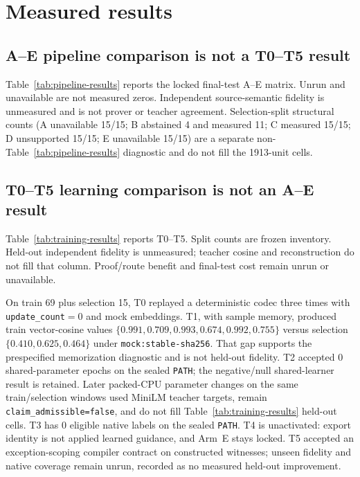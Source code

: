 \documentclass{article}
\begin{document}


\section{Measured results}
\subsection{A--E pipeline comparison is not a T0--T5 result}
Table~\ref{tab:pipeline-results} reports the locked final-test A--E matrix. Unrun and unavailable are not measured zeros. Independent source-semantic fidelity is unmeasured and is not prover or teacher agreement. Selection-split structural counts (A unavailable 15/15; B abstained 4 and measured 11; C measured 15/15; D unsupported 15/15; E unavailable 15/15) are a separate non-Table~\ref{tab:pipeline-results} diagnostic and do not fill the 1913-unit cells.



\subsection{T0--T5 learning comparison is not an A--E result}
Table~\ref{tab:training-results} reports T0--T5. Split counts are frozen inventory. Held-out independent fidelity is unmeasured; teacher cosine and reconstruction do not fill that column. Proof/route benefit and final-test cost remain unrun or unavailable.



On train 69 plus selection 15, T0 replayed a deterministic codec three times with \texttt{update\_count}$=0$ and mock embeddings. T1, with sample memory, produced train vector-cosine values $\{0.991,0.709,0.993,0.674,0.992,0.755\}$ versus selection $\{0.410,0.625,0.464\}$ under \texttt{mock:stable-sha256}. That gap supports the prespecified memorization diagnostic and is not held-out fidelity. T2 accepted $0$ shared-parameter epochs on the sealed \texttt{PATH}; the negative/null shared-learner result is retained. Later packed-CPU parameter changes on the same train/selection windows used MiniLM teacher targets, remain \texttt{claim\_admissible=false}, and do not fill Table~\ref{tab:training-results} held-out cells. T3 has $0$ eligible native labels on the sealed \texttt{PATH}. T4 is unactivated: export identity is not applied learned guidance, and Arm~E stays locked. T5 accepted an exception-scoping compiler contract on constructed witnesses; unseen fidelity and native coverage remain unrun, recorded as no measured held-out improvement.
\end{document}
